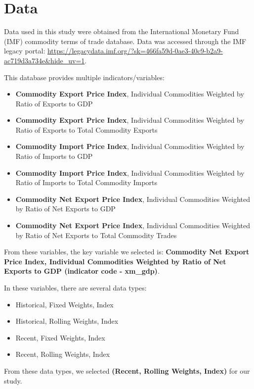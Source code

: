 \documentclass[12pt,a4paper]{report} %
\begin{document}
\chapter{Data}

Data used in this study were obtained from the International Monetary Fund (IMF) commodity terms of trade database. Data was accessed through the IMF legacy portal: \url{https://legacydata.imf.org/?sk=466fa59d-0ae3-40c9-b2a9-ac719d3a734e&hide_uv=1}.

This database provides multiple indicators/variables:

\begin{itemize}
	\item \textbf{Commodity Export Price Index}, Individual Commodities Weighted by Ratio of Exports to GDP
	\item \textbf{Commodity Export Price Index}, Individual Commodities Weighted by Ratio of Exports to Total Commodity Exports
	\item \textbf{Commodity Import Price Index}, Individual Commodities Weighted by Ratio of Imports to GDP
	\item \textbf{Commodity Import Price Index}, Individual Commodities Weighted by Ratio of Imports to Total Commodity Imports
	\item \textbf{Commodity Net Export Price Index}, Individual Commodities Weighted by Ratio of Net Exports to GDP
	\item \textbf{Commodity Net Export Price Index}, Individual Commodities Weighted by Ratio of Net Exports to Total Commodity Trades
\end{itemize}

From these variables, the key variable we selected is: \textbf{Commodity Net Export Price Index, Individual Commodities Weighted by Ratio of Net Exports to GDP (indicator code - xm\_gdp)}.

In these variables, there are several data types:

\begin{itemize}
	\item Historical, Fixed Weights, Index
	\item Historical, Rolling Weights, Index
	\item Recent, Fixed Weights, Index
	\item Recent, Rolling Weights, Index
\end{itemize}

From these data types, we selected \textbf{(Recent, Rolling Weights, Index)} for our study.
\end{document}
